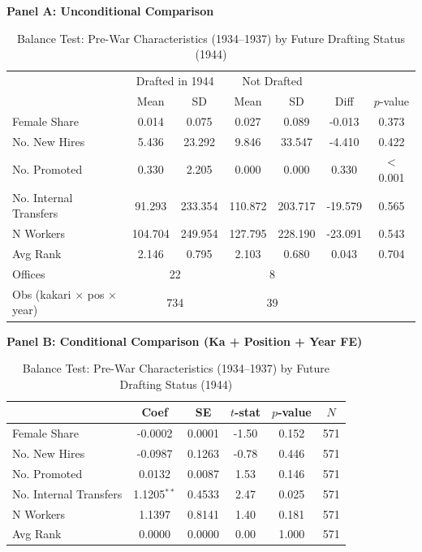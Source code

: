 \begin{table}[htbp]
\centering
\caption{Balance Test: Pre-War Characteristics (1934--1937) by Future Drafting Status (1944)}
\label{tab:balance}
\small
\begin{threeparttable}

\textbf{Panel A: Unconditional Comparison}
\medskip

\begin{tabular}{lcccccc}
\toprule
 & \multicolumn{2}{c}{Drafted in 1944} & \multicolumn{2}{c}{Not Drafted} & & \\
 & Mean & SD & Mean & SD & Diff & $p$-value \\
\midrule
Female Share & 0.014 & 0.075 & 0.027 & 0.089 & -0.013 & 0.373 \\
No. New Hires & 5.436 & 23.292 & 9.846 & 33.547 & -4.410 & 0.422 \\
No. Promoted & 0.330 & 2.205 & 0.000 & 0.000 & 0.330 & $<$0.001 \\
No. Internal Transfers & 91.293 & 233.354 & 110.872 & 203.717 & -19.579 & 0.565 \\
N Workers & 104.704 & 249.954 & 127.795 & 228.190 & -23.091 & 0.543 \\
Avg Rank & 2.146 & 0.795 & 2.103 & 0.680 & 0.043 & 0.704 \\
\midrule
Offices & \multicolumn{2}{c}{22} & \multicolumn{2}{c}{8} & & \\
Obs (kakari $\times$ pos $\times$ year) & \multicolumn{2}{c}{734} & \multicolumn{2}{c}{39} & & \\
\bottomrule
\end{tabular}

\bigskip

\textbf{Panel B: Conditional Comparison (Ka + Position + Year FE)}
\medskip

\begin{tabular}{lccccc}
\toprule
 & Coef & SE & $t$-stat & $p$-value & $N$ \\
\midrule
Female Share & -0.0002 & 0.0001 & -1.50 & 0.152 & 571 \\
No. New Hires & -0.0987 & 0.1263 & -0.78 & 0.446 & 571 \\
No. Promoted & 0.0132 & 0.0087 & 1.53 & 0.146 & 571 \\
No. Internal Transfers & 1.1205$^{**}$ & 0.4533 & 2.47 & 0.025 & 571 \\
N Workers & 1.1397 & 0.8141 & 1.40 & 0.181 & 571 \\
Avg Rank & 0.0000 & 0.0000 & 0.00 & 1.000 & 571 \\
\bottomrule
\end{tabular}


\end{threeparttable}
\end{table}
